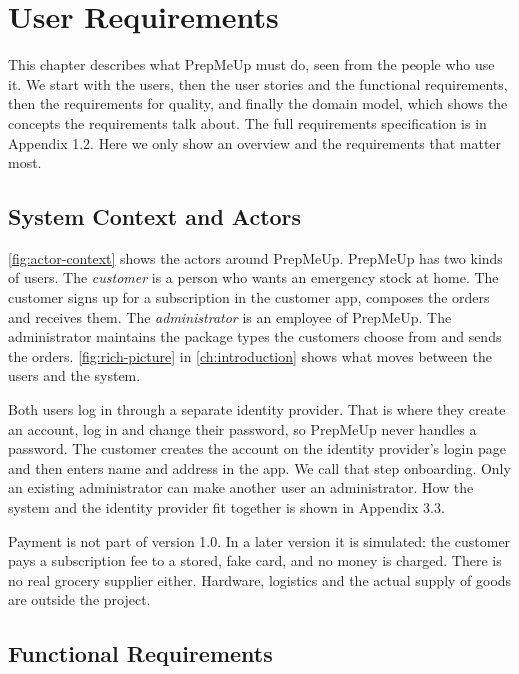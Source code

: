 \chapter{User Requirements}\label{ch:requirements}

This chapter describes what PrepMeUp must do, seen from the people who use it. We
start with the users, then the user stories and the functional requirements, then
the requirements for quality, and finally the domain model, which shows the concepts
the requirements talk about. The full requirements specification is in Appendix 1.2.
Here we only show an overview and the requirements that matter most.

\section{System Context and Actors}\label{sec:req-users}

\autoref{fig:actor-context} shows the actors around PrepMeUp. PrepMeUp has two kinds of users. The \emph{customer} is a person who wants an
emergency stock at home. The customer signs up for a subscription in the customer
app, composes the orders and receives them. The \emph{administrator} is an employee of
PrepMeUp. The administrator maintains the package types the customers choose from and
sends the orders. \autoref{fig:rich-picture} in \autoref{ch:introduction} shows what
moves between the users and the system.


Both users log in through a separate identity provider. That is where they create an
account, log in and change their password, so PrepMeUp never handles a password. The
customer creates the account on the identity provider's login page and then enters
name and address in the app. We call that step onboarding. Only an existing
administrator can make another user an administrator. How the system and the identity
provider fit together is shown in Appendix 3.3.

Payment is not part of version 1.0. In a later version it is simulated: the customer
pays a subscription fee to a stored, fake card, and no money is charged. There is no real grocery supplier either. Hardware, logistics and
the actual supply of goods are outside the project.

\section{Functional Requirements}\label{sec:req-functional}

